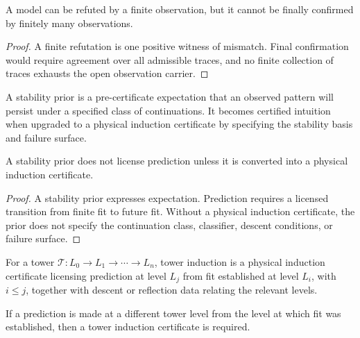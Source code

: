 \begin{theorem}
\label{thm:falsification-finite-confirmation-open-refined}
A model can be refuted by a finite observation, but it cannot be finally confirmed by finitely many observations.
\end{theorem}

\begin{proof}
A finite refutation is one positive witness of mismatch. Final confirmation would require agreement over all admissible traces, and no finite collection of traces exhausts the open observation carrier.
\end{proof}

\begin{definition}
\label{def:stability-prior-certified-intuition}
A stability prior is a pre-certificate expectation that an observed pattern will persist under a specified class of continuations. It becomes certified intuition when upgraded to a physical induction certificate by specifying the stability basis and failure surface.
\end{definition}

\begin{theorem}
\label{thm:physical-intuition-not-oracle}
A stability prior does not license prediction unless it is converted into a physical induction certificate.
\end{theorem}

\begin{proof}
A stability prior expresses expectation. Prediction requires a licensed transition from finite fit to future fit. Without a physical induction certificate, the prior does not specify the continuation class, classifier, descent conditions, or failure surface.
\end{proof}

\begin{definition}
\label{def:tower-induction}
For a tower $\mathcal T:L_0\to L_1\to\cdots\to L_n$, tower induction is a physical induction certificate licensing prediction at level $L_j$ from fit established at level $L_i$, with $i\leq j$, together with descent or reflection data relating the relevant levels.
\end{definition}

\begin{theorem}
\label{thm:cross-level-prediction-requires-tower-induction}
If a prediction is made at a different tower level from the level at which fit was established, then a tower induction certificate is required.
\end{theorem}

